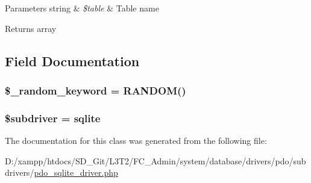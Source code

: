 \begin{DoxyParams}[1]{Parameters}
string & {\em \$table} & Table name \\
\hline
\end{DoxyParams}
\begin{DoxyReturn}{Returns}
array 
\end{DoxyReturn}


\subsection{Field Documentation}
\hypertarget{class_c_i___d_b__pdo__sqlite__driver_a10213aa6e05f6d924d3277bb1d2fea00}{}
\subsubsection[{\$\+\_\+random\+\_\+keyword}]{\setlength{\rightskip}{0pt plus 5cm}\$\+\_\+random\+\_\+keyword = \textquotesingle{} R\+A\+N\+D\+O\+M()\textquotesingle{}\hspace{0.3cm}{\ttfamily [protected]}}\label{class_c_i___d_b__pdo__sqlite__driver_a10213aa6e05f6d924d3277bb1d2fea00}
\hypertarget{class_c_i___d_b__pdo__sqlite__driver_a1322ca756348b11d080cb7a4f590de15}{}
\subsubsection[{\$subdriver}]{\setlength{\rightskip}{0pt plus 5cm}\$subdriver = \textquotesingle{}sqlite\textquotesingle{}}\label{class_c_i___d_b__pdo__sqlite__driver_a1322ca756348b11d080cb7a4f590de15}


The documentation for this class was generated from the following file\+:\begin{DoxyCompactItemize}
\item 
D\+:/xampp/htdocs/\+S\+D\+\_\+\+Git/\+L3\+T2/\+F\+C\+\_\+\+Admin/system/database/drivers/pdo/subdrivers/\hyperlink{pdo__sqlite__driver_8php}{pdo\+\_\+sqlite\+\_\+driver.\+php}\end{DoxyCompactItemize}

